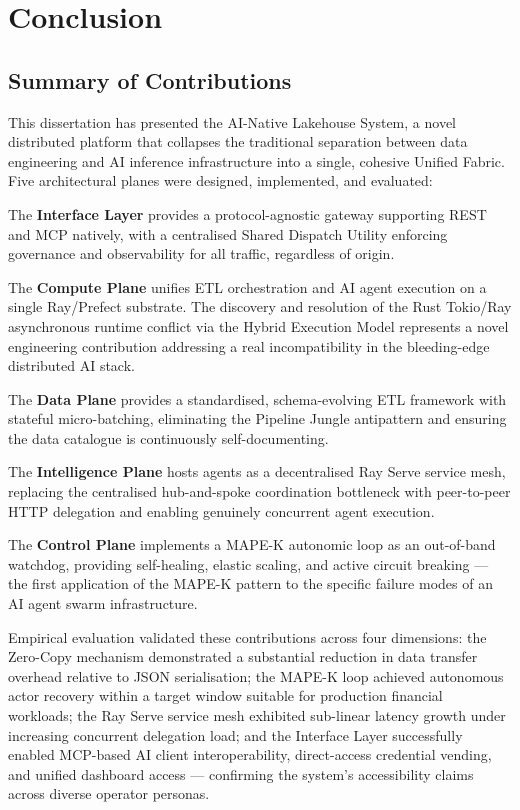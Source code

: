 \documentclass[12pt, a4paper]{report}
\begin{document}
\chapter{Conclusion}
\label{ch:conclusion}

\section{Summary of Contributions}
\label{sec:summary}

This dissertation has presented the AI-Native Lakehouse System, a novel distributed
platform that collapses the traditional separation between data engineering and AI
inference infrastructure into a single, cohesive Unified Fabric.
Five architectural planes were designed, implemented, and evaluated:

The \textbf{Interface Layer} provides a protocol-agnostic gateway supporting REST and
MCP natively, with a centralised Shared Dispatch Utility enforcing governance and
observability for all traffic, regardless of origin.

The \textbf{Compute Plane} unifies ETL orchestration and AI agent execution on a single
Ray/Prefect substrate.
The discovery and resolution of the Rust Tokio/Ray asynchronous runtime conflict via the
Hybrid Execution Model represents a novel engineering contribution addressing a real
incompatibility in the bleeding-edge distributed AI stack.

The \textbf{Data Plane} provides a standardised, schema-evolving ETL framework with
stateful micro-batching, eliminating the Pipeline Jungle antipattern and ensuring the
data catalogue is continuously self-documenting.

The \textbf{Intelligence Plane} hosts agents as a decentralised Ray Serve service mesh,
replacing the centralised hub-and-spoke coordination bottleneck with peer-to-peer
HTTP delegation and enabling genuinely concurrent agent execution.

The \textbf{Control Plane} implements a MAPE-K autonomic loop as an out-of-band
watchdog, providing self-healing, elastic scaling, and active circuit breaking — the
first application of the MAPE-K pattern to the specific failure modes of an AI agent
swarm infrastructure.

Empirical evaluation validated these contributions across four dimensions:
the Zero-Copy mechanism demonstrated a substantial reduction in data transfer overhead
relative to JSON serialisation; the MAPE-K loop achieved autonomous actor recovery
within a target window suitable for production financial workloads; the Ray Serve
service mesh exhibited sub-linear latency growth under increasing concurrent delegation
load; and the Interface Layer successfully enabled MCP-based AI client interoperability,
direct-access credential vending, and unified dashboard access — confirming the
system's accessibility claims across diverse operator personas.
\end{document}
